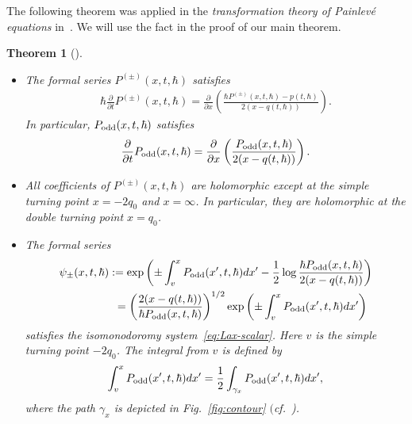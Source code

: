 \documentclass[pdftex]{sigma}
\newtheorem{thm}{Theorem}[section]
\theoremstyle{definition}
\numberwithin{equation}{section}
\def\p{\partial}
\begin{document}
The following theorem was applied in the
{\it transformation theory of Painlev\'e equations}
in~\cite{KT-PI}. We will use the fact
in the proof of our main theorem.

\begin{thm}[]
\label{thm:Podd-and-t-derivative} \quad
\begin{itemize}\itemsep=0pt
\item[$(i)$]
The formal series $P^{(\pm)}(x,t,\hbar)$ satisfies
\begin{gather} \label{eq:dt-P}
\hbar \frac{\p}{\p t}P^{(\pm)}(x,t,\hbar) = \frac{\p}{\p x}\left(
\frac{\hbar P^{(\pm)}(x,t,\hbar) - p(t,\hbar)}{2(x-q(t,\hbar))}
\right).
\end{gather}
In particular, $P_{\rm odd}(x,t,\hbar)$ satisfies
\begin{gather} \label{eq:dt-Podd}
\frac{\p}{\p t}P_{\rm odd}(x,t,\hbar) =
\frac{\p}{\p x}\left( \frac{P_{\rm odd}(x,t,\hbar)}{2(x-q(t,\hbar))}
\right).
\end{gather}

\item[$(ii)$]
All coefficients of $P^{(\pm)}(x,t,\hbar)$ are holomorphic
except at the simple turning point $x=-2q_{0}$ and $x= \infty$.
In particular, they are holomorphic at
the double turning point $x=q_{0}$.

\item[$(iii)$]
The formal series
\begin{gather}
\psi_{\pm}(x,t,\hbar)   :=    \exp\left(
\pm \int^{x}_{v} P_{\rm odd}(x',t,\hbar)dx'
- \frac{1}{2} \log \frac{ \hbar P_{\rm odd}(x,t,\hbar)}
{2(x-q(t,\hbar))}\right)  \nonumber \\
 \hphantom{\psi_{\pm}(x,t,\hbar)}{} =
\left(\frac{2(x-q(t,\hbar))}{\hbar P_{\rm odd}(x,t,\hbar)} \right)^{1/2}
\exp\left( \pm \int^{x}_{v} P_{\rm odd}(x',t,\hbar) dx' \right)\label{eq:WKB-IM}
\end{gather}
satisfies the isomonodoromy system~\eqref{eq:Lax-scalar}.
Here $v$ is the simple turning point $-2q_{0}$.
The integral from $v$ is defined by
\begin{gather} \label{eq:contour-integral-Podd}
\int^{x}_{v} P_{\rm odd}(x',t,\hbar) dx' =
\frac{1}{2} \int_{\gamma_x} P_{\rm odd}(x',t,\hbar) dx',
\end{gather}
where the path $\gamma_x$ is depicted in Fig.~{\rm \ref{fig:contour}}
$($cf.~{\rm \cite[Section~2]{KT05})}.
\end{itemize}
\end{thm}
\end{document}
